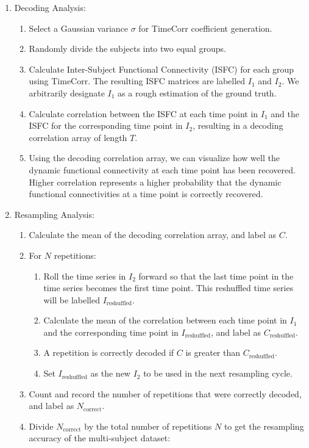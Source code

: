 \documentclass[11pt]{article}
\begin{document}
\begin{enumerate}
\item Decoding Analysis:
\begin{enumerate}
\item Select a Gaussian variance $\sigma$ for TimeCorr coefficient generation.
\item Randomly divide the subjects into two equal groups.
\item Calculate Inter-Subject Functional Connectivity (ISFC) for each group using TimeCorr. The resulting ISFC matrices are labelled $I_1$ and $I_2$. We arbitrarily designate $I_1$ as a rough estimation of the ground truth.
\item Calculate correlation between the ISFC at each time point in $I_1$ and the ISFC for the corresponding time point in $I_2$, resulting in a decoding correlation array of length $T$.
\item Using the decoding correlation array, we can visualize how well the dynamic functional connectivity at each time point has been recovered. Higher correlation represents a higher probability that the dynamic functional connectivities at a time point is correctly recovered.
\end{enumerate}
\item Resampling Analysis:
\begin{enumerate}
\item Calculate the mean of the decoding correlation array, and label as $C$.
\item For $N$ repetitions:
\begin{enumerate}
\item Roll the time series in $I_2$ forward so that the last time point in the time series becomes the first time point. This reshuffled time series will be labelled $I_{\text{reshuffled}}$.
\item Calculate the mean of the correlation between each time point in $I_1$ and the corresponding time point in $I_{\text{reshuffled}}$, and label as $C_{\text{reshuffled}}$.
\item A repetition is correctly decoded if $C$ is greater than $C_{\text{reshuffled}}$.
\item Set $I_{\text{reshuffled}}$ as the new $I_2$ to be used in the next resampling cycle.
\end{enumerate}
\item Count and record the number of repetitions that were correctly decoded, and label as $N_{\text{correct}}$.
\item Divide $N_{\text{correct}}$ by the total number of repetitions $N$ to get the resampling accuracy of the multi-subject dataset:

\end{enumerate}
\end{enumerate}
\end{document}
